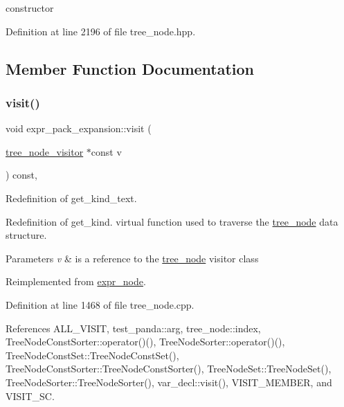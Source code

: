 constructor 



Definition at line 2196 of file tree\+\_\+node.\+hpp.



\subsection{Member Function Documentation}
\mbox{\label{structexpr__pack__expansion_aeebf07512e982ce8b1fb21276362c6d4}} 
\subsubsection{\texorpdfstring{visit()}{visit()}}
{\footnotesize\ttfamily void expr\+\_\+pack\+\_\+expansion\+::visit (\begin{DoxyParamCaption}\item[{\hyperlink{classtree__node__visitor}{tree\+\_\+node\+\_\+visitor} $\ast$const}]{v }\end{DoxyParamCaption}) const\hspace{0.3cm}{\ttfamily [override]}, {\ttfamily [virtual]}}



Redefinition of get\+\_\+kind\+\_\+text. 

Redefinition of get\+\_\+kind. virtual function used to traverse the \hyperlink{classtree__node}{tree\+\_\+node} data structure. 
\begin{DoxyParams}{Parameters}
{\em v} & is a reference to the \hyperlink{classtree__node}{tree\+\_\+node} visitor class \\
\hline
\end{DoxyParams}


Reimplemented from \hyperlink{structexpr__node_aac767878f13ca07371dde2c3938ef38a}{expr\+\_\+node}.



Definition at line 1468 of file tree\+\_\+node.\+cpp.



References A\+L\+L\+\_\+\+V\+I\+S\+IT, test\+\_\+panda\+::arg, tree\+\_\+node\+::index, Tree\+Node\+Const\+Sorter\+::operator()(), Tree\+Node\+Sorter\+::operator()(), Tree\+Node\+Const\+Set\+::\+Tree\+Node\+Const\+Set(), Tree\+Node\+Const\+Sorter\+::\+Tree\+Node\+Const\+Sorter(), Tree\+Node\+Set\+::\+Tree\+Node\+Set(), Tree\+Node\+Sorter\+::\+Tree\+Node\+Sorter(), var\+\_\+decl\+::visit(), V\+I\+S\+I\+T\+\_\+\+M\+E\+M\+B\+ER, and V\+I\+S\+I\+T\+\_\+\+SC.

